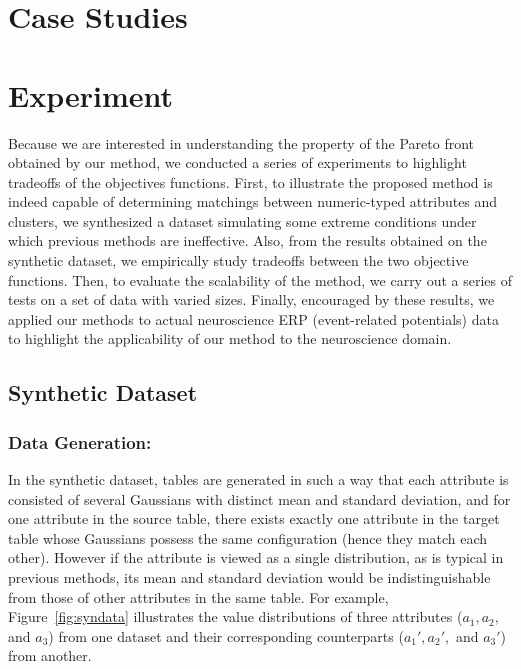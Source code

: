 \section{Case Studies}
\section{Experiment}
\label{sec:experiment}
Because we are interested in understanding the property of the Pareto front obtained by our method, we conducted a series of experiments to highlight tradeoffs of the objectives functions. First, to illustrate the proposed method is indeed capable of determining matchings between numeric-typed attributes and clusters, we synthesized a dataset simulating some extreme conditions under which previous methods are ineffective. Also, from the results obtained on the synthetic dataset, we empirically study tradeoffs between the two objective functions. Then, to evaluate the scalability of the method, we carry out a series of tests on a set of data with varied sizes. Finally, encouraged by these results, we applied our methods to actual neuroscience ERP (event-related potentials) data to highlight the applicability of our method to the neuroscience domain.

\subsection{Synthetic Dataset}
\label{sec:syn_exp}
\subsubsection{Data Generation:}

In the synthetic dataset, tables are generated in such a way that each attribute is consisted of several Gaussians with distinct mean and standard deviation, and for one attribute in the source table, there exists exactly one attribute in the target table whose Gaussians possess the same configuration (hence they match each other). However if the attribute is viewed as a single distribution, as is typical in previous methods, its mean and standard deviation would be indistinguishable from those of other attributes in the same table. For example, Figure~\ref{fig:syndata} illustrates the value distributions of three attributes ($a_1, a_2,$ and $a_3$) from one dataset and their corresponding counterparts ($a_1', a_2',$ and $a_3'$) from another.

